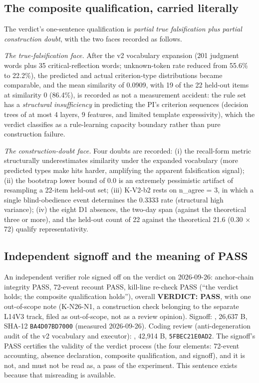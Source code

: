 \documentclass[11pt]{article}
\newcommand{\sha}[1]{\texttt{#1}}
\begin{document}
\subsection{The composite qualification, carried literally}
\noindent The verdict's one-sentence qualification is \emph{partial true falsification plus partial construction doubt}, with the two faces recorded as follows.\par
\noindent \emph{The true-falsification face.} After the v2 vocabulary expansion (201 judgment words plus 35 critical-reflection words; unknown-token rate reduced from 55.6\% to 22.2\%), the predicted and actual criterion-type distributions became comparable, and the mean similarity of 0.0909, with 19 of the 22 held-out items at similarity 0 (86.4\%), is recorded as not a measurement accident: the rule set has a \emph{structural insufficiency} in predicting the PI's criterion sequences (decision trees of at most 4 layers, 9 features, and limited template expressivity), which the verdict classifies as a rule-learning capacity boundary rather than pure construction failure.\par
\noindent \emph{The construction-doubt face.} Four doubts are recorded: (i) the recall-form metric structurally underestimates similarity under the expanded vocabulary (more predicted types make hits harder, amplifying the apparent falsification signal); (ii) the bootstrap lower bound of 0.0 is an extremely pessimistic artifact of resampling a 22-item held-out set; (iii) K-V2-b2 rests on n\_agree = 3, in which a single blind-obedience event determines the 0.3333 rate (structural high variance); (iv) the eight D1 absences, the two-day span (against the theoretical three or more), and the held-out count of 22 against the theoretical 21.6 (0.30 × 72) qualify representativity.\par
\subsection{Independent signoff and the meaning of PASS}
\noindent An independent verifier role signed off on the verdict on 2026-09-26: anchor-chain integrity PASS, 72-event recount PASS, kill-line re-check PASS (``the verdict holds; the composite qualification holds''), overall \textbf{VERDICT: PASS}, with one out-of-scope note (K-N26-N1, a construction check belonging to the separate L14V3 track, filed as out-of-scope, not as a review opinion). Signoff: , 26,637 B, SHA-12 \sha{BA4D07BD7000} (measured 2026-09-26). Coding review (anti-degeneration audit of the v2 vocabulary and executor): , 42,914 B, \sha{5FBEC21E0AD2}. The signoff's PASS certifies the validity of the verdict process (the four elements: 72-event accounting, absence declaration, composite qualification, and signoff), and it is not, and must not be read as, a pass of the experiment. This sentence exists because that misreading is available.\par
\end{document}

